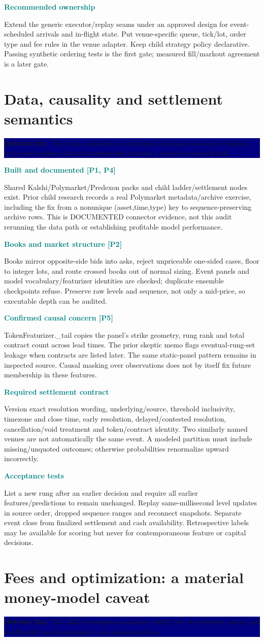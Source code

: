 \documentclass[10pt,letterpaper]{article}
\newcommand{\bl}[1]{\noindent\colorbox{navy}{\parbox{\dimexpr\linewidth-2\fboxsep}{\color{white}\textbf{Bottom line.} #1}}\par\medskip}
\newcommand{\topic}[2]{\clearpage\section{#1}\bl{#2}}
\newcommand{\sub}[1]{\par\textbf{\textcolor{teal}{#1}}\par}
\begin{document}
\sub{Recommended ownership}
Extend the generic executor/replay seams under an approved design for event-scheduled arrivals and in-flight state. Put venue-specific queue, tick/lot, order type and fee rules in the venue adapter. Keep child strategy policy declarative. Passing synthetic ordering tests is the first gate; measured fill/markout agreement is a later gate.
\topic{Data, causality and settlement semantics}{The data machinery is substantial and has real-source evidence, but point-in-time contract membership remains a concrete research risk.}
\sub{Built and documented [P1, P4]}
Shared Kalshi/Polymarket/Predexon packs and child ladder/settlement nodes exist. Prior child research records a real Polymarket metadata/archive exercise, including the fix from a nonunique (asset,time,type) key to sequence-preserving archive rows. This is DOCUMENTED connector evidence, not this audit rerunning the data path or establishing profitable model performance.
\sub{Books and market structure [P2]}
Books mirror opposite-side bids into asks, reject unpriceable one-sided cases, floor to integer lots, and route crossed books out of normal sizing. Event panels and model vocabulary/featurizer identities are checked; duplicate ensemble checkpoints refuse. Preserve raw levels and sequence, not only a mid-price, so executable depth can be audited.
\sub{Confirmed causal concern [P5]}
TokenFeaturizer.\_tail copies the panel's strike geometry, rung rank and total contract count across lead times. The prior skeptic memo flags eventual-rung-set leakage when contracts are listed later. The same static-panel pattern remains in inspected source. Causal masking over observations does not by itself fix future membership in these features.
\sub{Required settlement contract}
Version exact resolution wording, underlying/source, threshold inclusivity, timezone and close time, early resolution, delayed/contested resolution, cancellation/void treatment and token/contract identity. Two similarly named venues are not automatically the same event. A modeled partition must include missing/unquoted outcomes; otherwise probabilities renormalize upward incorrectly.
\sub{Acceptance tests}
List a new rung after an earlier decision and require all earlier features/predictions to remain unchanged. Replay same-millisecond level updates in source order, dropped sequence ranges and reconnect snapshots. Separate event close from finalized settlement and cash availability. Retrospective labels may be available for scoring but never for contemporaneous feature or capital decisions.
\topic{Fees and optimization: a material money-model caveat}{The child recomputes nonlinear utility, but its reported outlay and wealth still use the optimizer's fee approximation.}
\end{document}
